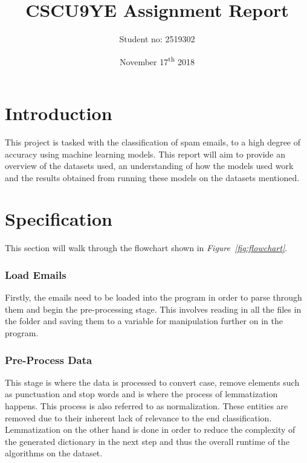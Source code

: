 \documentclass[11pt, a4paper]{article}
\title{CSCU9YE Assignment Report}
\author{Student no: 2519302}
\date{November 17\textsuperscript{th} 2018}
\begin{document}
\begin{titlepage}
\maketitle
\clearpage\thispagestyle{empty}
\end{titlepage}
\doublespacing
{}
\tableofcontents
\thispagestyle{empty}
\newpage
\singlespacing

\section{Introduction}

This project is tasked with the classification of spam emails, to a high degree of accuracy using machine learning models. This report will aim to provide an overview of the datasets used, an understanding of how the models used work and the results obtained from running these models on the datasets mentioned.  
\section{Specification}

This section will walk through the flowchart shown in \emph{Figure~\ref{fig:flowchart}}.

\subsubsection*{Load Emails}

Firstly, the emails need to be loaded into the program in order to parse through them and begin the pre-processing stage. This involves reading in all the files in the folder and saving them to a variable for manipulation further on in the program. 

\subsubsection*{Pre-Process Data}

This stage is where the data is processed to convert case, remove elements such as punctuation and stop words and is where the process of lemmatization happens. This process is also referred to as normalization. These entities are removed due to their inherent lack of relevance to the end classification. Lemmatization on the other hand is done in order to reduce the complexity of the generated dictionary in the next step and thus  the overall runtime of the algorithms on the dataset.
\end{document}

